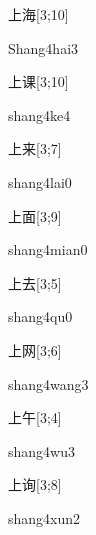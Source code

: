 \begin{verbete}{上海}[3;10]
\begin{pronuncia}{Shang4hai3}
\end{pronuncia}
\end{verbete}

\begin{verbete}[shang4ke4]{上课}[3;10]
\begin{pronuncia}{shang4ke4}
\end{pronuncia}
\end{verbete}

\begin{verbete}{上来}[3;7]
\begin{pronuncia}{shang4lai0}
\end{pronuncia}
\end{verbete}

\begin{verbete}{上面}[3;9]
\begin{pronuncia}{shang4mian0}
\end{pronuncia}
\end{verbete}

\begin{verbete}[shang4qu0]{上去}[3;5]
\begin{pronuncia}{shang4qu0}
\end{pronuncia}
\end{verbete}

\begin{verbete}{上网}[3;6]
\begin{pronuncia}{shang4wang3}
\end{pronuncia}
\end{verbete}

\begin{verbete}[shang4wu3]{上午}[3;4]
\begin{pronuncia}{shang4wu3}
\end{pronuncia}
\end{verbete}

\begin{verbete}{上询}[3;8]
\begin{pronuncia}{shang4xun2}
\end{pronuncia}
\end{verbete}

